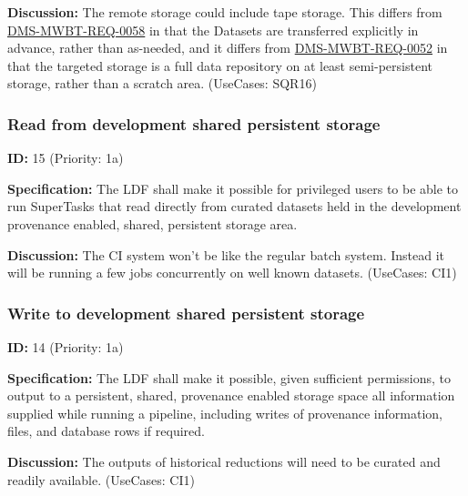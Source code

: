 \documentclass[SE,toc,lsstdraft]{lsstdoc}
\newcommand{\addendum}{}
\begin{document}
\textbf{Discussion:}
The remote storage could include tape storage.  This differs from \hyperref[DMS-MWBT-REQ-0058]{DMS-MWBT-REQ-0058} in that the Datasets are transferred explicitly in advance, rather than as-needed, and it differs from \hyperref[DMS-MWBT-REQ-0052]{DMS-MWBT-REQ-0052} in that the targeted storage is a full data repository on at least semi-persistent storage, rather than a scratch area. (UseCases: SQR16)

\subsubsection{Read from development shared persistent storage}

\label{15}
\textbf{ID:} 15 (Priority: 1a)

\textbf{Specification:}
The LDF shall make it possible for privileged users to be able to run SuperTasks that read directly from curated datasets held in the development provenance enabled, shared, persistent storage area.

\textbf{Discussion:}
The CI system won't be like the regular batch system.  Instead it will be running a few jobs concurrently on well known datasets. (UseCases: CI1)

\subsubsection{Write to development shared persistent storage}

\label{14}
\textbf{ID:} 14 (Priority: 1a)

\textbf{Specification:}
The LDF shall make it possible, given sufficient permissions, to output to a persistent, shared, provenance enabled storage space all information supplied while running a pipeline, including writes of provenance information, files, and database rows if required.

\textbf{Discussion:}
The outputs of historical reductions will need to be curated and readily available. (UseCases: CI1)

\addendum


\end{document}
